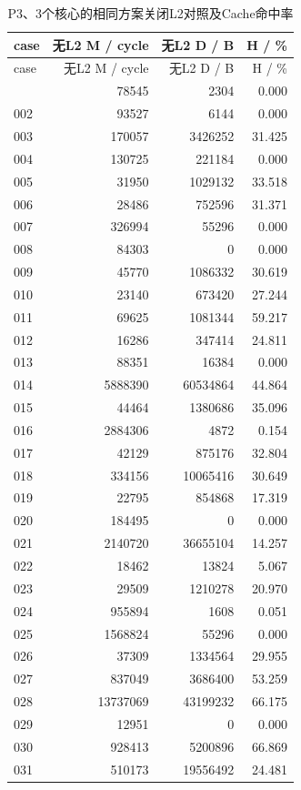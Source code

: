 \documentclass[anonymous,notoc]{gmcm2026}
\begin{document}
\begin{longtable}{lrrr}
\caption{P3、3个核心的相同方案关闭L2对照及Cache命中率}\\
\toprule
case & 无L2 M / cycle & 无L2 D / B & H / \%\\\midrule
\endfirsthead
\toprule
case & 无L2 M / cycle & 无L2 D / B & H / \%\\\midrule
\endhead
\bottomrule\endfoot
001 & 78545 & 2304 & 0.000 \\
002 & 93527 & 6144 & 0.000 \\
003 & 170057 & 3426252 & 31.425 \\
004 & 130725 & 221184 & 0.000 \\
005 & 31950 & 1029132 & 33.518 \\
006 & 28486 & 752596 & 31.371 \\
007 & 326994 & 55296 & 0.000 \\
008 & 84303 & 0 & 0.000 \\
009 & 45770 & 1086332 & 30.619 \\
010 & 23140 & 673420 & 27.244 \\
011 & 69625 & 1081344 & 59.217 \\
012 & 16286 & 347414 & 24.811 \\
013 & 88351 & 16384 & 0.000 \\
014 & 5888390 & 60534864 & 44.864 \\
015 & 44464 & 1380686 & 35.096 \\
016 & 2884306 & 4872 & 0.154 \\
017 & 42129 & 875176 & 32.804 \\
018 & 334156 & 10065416 & 30.649 \\
019 & 22795 & 854868 & 17.319 \\
020 & 184495 & 0 & 0.000 \\
021 & 2140720 & 36655104 & 14.257 \\
022 & 18462 & 13824 & 5.067 \\
023 & 29509 & 1210278 & 20.970 \\
024 & 955894 & 1608 & 0.051 \\
025 & 1568824 & 55296 & 0.000 \\
026 & 37309 & 1334564 & 29.955 \\
027 & 837049 & 3686400 & 53.259 \\
028 & 13737069 & 43199232 & 66.175 \\
029 & 12951 & 0 & 0.000 \\
030 & 928413 & 5200896 & 66.869 \\
031 & 510173 & 19556492 & 24.481 \\

\end{longtable}
\end{document}
